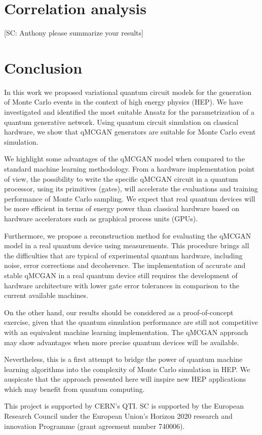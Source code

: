 \documentclass[twocolumn,preprintnumbers,superscriptaddress]{revtex4-2}
\begin{document}
\section{Correlation analysis}

{\color{red}[SC: Anthony please summarize your results]}

\section{Conclusion}
\label{sec:conclusion}

In this work we proposed variational quantum circuit models for the generation
of Monte Carlo events in the context of high energy physics (HEP). We have
investigated and identified the most suitable Ansatz for the parametrization of
a quantum generative network. Using quantum circuit simulation on classical
hardware, we show that qMCGAN generators are suitable for Monte Carlo event
simulation.

We highlight some advantages of the qMCGAN model when compared to the standard
machine learning methodology. From a hardware implementation point of view, the
possibility to write the specific qMCGAN circuit in a quantum processor, using
its primitives (gates), will accelerate the evaluations and training performance
of Monte Carlo sampling. We expect that real quantum devices will be more
efficient in terms of energy power than classical hardware based on hardware
accelerators such as graphical process units (GPUs).

Furthermore, we propose a reconstruction method for evaluating the qMCGAN model
in a real quantum device using measurements. This procedure brings all the
difficulties that are typical of experimental quantum hardware, including noise,
error corrections and decoherence. The implementation of accurate and stable
qMCGAN in a real quantum device still requires the development of hardware
architecture with lower gate error tolerances in comparison to the current
available machines.

On the other hand, our results should be considered as a proof-of-concept
exercise, given that the quantum simulation performance are still not
competitive with an equivalent machine learning implementation. The qMCGAN
approach may show advantages when more precise quantum devices will be
available.

Nevertheless, this is a first attempt to bridge the power of quantum machine
learning algorithms into the complexity of Monte Carlo simulation in HEP. We
auspicate that the approach presented here will inspire new HEP applications
which may benefit from quantum computing.

\acknowledgments

This project is supported by CERN's QTI. SC is supported by the European
Research Council under the European Union's Horizon 2020 research and innovation
Programme (grant agreement number 740006).


\end{document}

